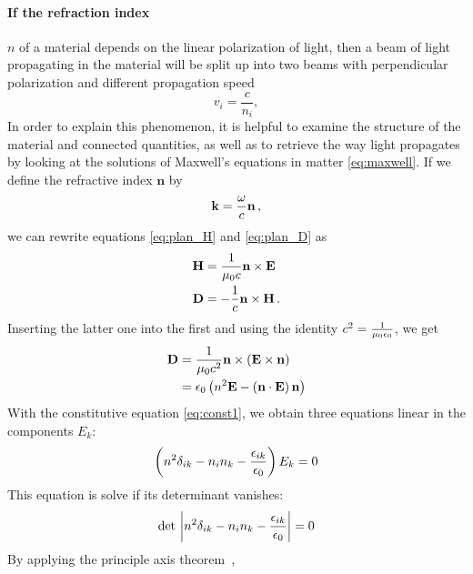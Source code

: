 \paragraph{If the refraction index}
 $n$ of a material depends on the linear polarization of light, 
then a beam of light propagating in the material will be split up into 
two beams with perpendicular polarization and different propagation speed 
\begin{equation}
   v_i = \frac{c}{n_i}, 
\end{equation}
In order to explain this phenomenon, it is helpful to examine the 
structure of the material and connected quantities, as well as 
to retrieve the way light propagates by looking at the solutions 
of Maxwell's equations in matter \eqref{eq:maxwell}.
If we define the 
refractive index $\mathbf{n}$ by 
\begin{equation}
    \mathbf{k} = \frac{\omega}{c} \mathbf{n} \, ,
    \label{eq:def_n}
\end{equation}
we can rewrite equations \eqref{eq:plan_H} and \eqref{eq:plan_D} as 
\begin{subequations}
\begin{align}
    \mathbf{H} &= \frac{1}{\mu_0 c} \mathbf{n} \times \mathbf{E} 
    \label{eq:plan_Hb} \\
    \mathbf{D} &= - \frac{1}{c} \mathbf{n} \times \mathbf{H}
    \label{eq:plan_Db} \, .
\end{align}
\end{subequations}
Inserting the latter one into the first and using 
the identity $c^2 = \frac{1}{\mu_0 \epsilon_0}$, we get 
\begin{equation}
    \begin{split}
    \mathbf{D}  &= \frac{1}{\mu_0 c^2} \mathbf{n} \times \left(\mathbf{E} \times \mathbf{n}\right) \\
        &= \epsilon_0 \left(n^2 \mathbf{E} - \left(\mathbf{n} \cdot \mathbf{E}\right) \mathbf{n} \right)
    \label{eq:D(E)}
    \end{split}
\end{equation}
With the constitutive equation \eqref{eq:const1}, we obtain three 
equations linear in the components $E_k$:
\begin{equation}
    \left(n^2 \delta_{ik} - n_i n_k - \frac{\epsilon_{ik}}{\epsilon_0}\right) E_k = 0
\end{equation}
This equation is solve if its determinant vanishes:
\begin{equation}
    \mathrm{det}\,\left|n^2 \delta_{ik} - n_i n_k - \frac{\epsilon_{ik}}{\epsilon_0}\right| = 0
\end{equation}
By applying the principle axis theorem~\cite{strang2003introduction}, 
